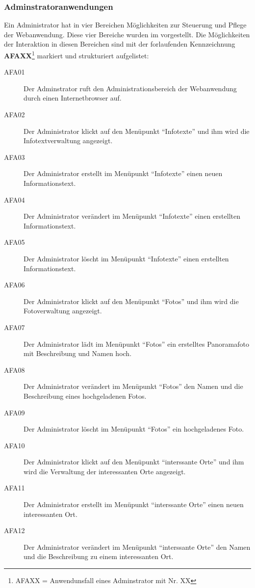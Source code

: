 \subsubsection{Adminstratoranwendungen}
\label{sec:Adminstratoranwendungen}

Ein Administrator hat in vier Bereichen Möglichkeiten zur
Steuerung und Pflege der Webanwendung. Diese vier Bereiche wurden im
 vorgestellt. Die Möglichkeiten der Interaktion
in diesen Bereichen sind mit der forlaufenden
Kennzeichnung \textbf{AFAXX}\footnote{AFAXX = Anwendunsfall eines Adminstrator
mit Nr. XX} markiert und strukturiert aufgelistet:

\begin{description}
  \item[AFA01] Der Adminstrator ruft den Administrationsbereich der
  Webanwendung durch einen Internetbrowser auf.
  \item[AFA02] Der Administrator klickt auf den Menüpunkt "`Infotexte"' und ihm
  wird die Infotextverwaltung angezeigt.
  \item[AFA03] Der Administrator erstellt im Menüpunkt "`Infotexte"' einen neuen
  Informationstext.
  \item[AFA04] Der Administrator verändert im Menüpunkt "`Infotexte"' einen
  erstellten Informationstext.
  \item[AFA05] Der Administrator löscht im Menüpunkt "`Infotexte"' einen
  erstellten Informationstext.
  \item[AFA06] Der Administrator klickt auf den Menüpunkt "`Fotos"' und ihm wird
  die Fotoverwaltung angezeigt.
  \item[AFA07] Der Administrator lädt im Menüpunkt "`Fotos"' ein erstelltes
  Panoramafoto mit Beschreibung und Namen hoch.
  \item[AFA08] Der Administrator verändert im Menüpunkt "`Fotos"' den Namen und
  die Beschreibung eines hochgeladenen Fotos.
  \item[AFA09] Der Administrator löscht im Menüpunkt "`Fotos"' ein hochgeladenes
  Foto.
  \item[AFA10] Der Administrator klickt auf den Menüpunkt "`interssante Orte"'
  und ihm wird die Verwaltung der interessanten Orte angezeigt.
  \item[AFA11] Der Administrator erstellt im Menüpunkt "`interssante Orte"'
  einen neuen interessanten Ort.
  \item[AFA12] Der Administrator verändert im Menüpunkt "`interssante Orte"' den
  Namen und die Beschreibung zu einem interessanten Ort.

\end{description}
